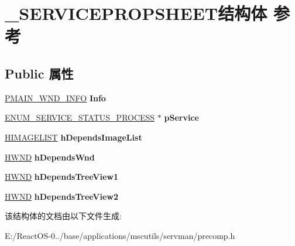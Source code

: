 \hypertarget{struct___s_e_r_v_i_c_e_p_r_o_p_s_h_e_e_t}{}\section{\+\_\+\+S\+E\+R\+V\+I\+C\+E\+P\+R\+O\+P\+S\+H\+E\+E\+T结构体 参考}
\label{struct___s_e_r_v_i_c_e_p_r_o_p_s_h_e_e_t}
\subsection*{Public 属性}
\begin{DoxyCompactItemize}
\item 
\mbox{\label{struct___s_e_r_v_i_c_e_p_r_o_p_s_h_e_e_t_ae9cf0384e6a06e002563e1fe7d062b21}} 
\hyperlink{struct___m_a_i_n___w_n_d___i_n_f_o}{P\+M\+A\+I\+N\+\_\+\+W\+N\+D\+\_\+\+I\+N\+FO} {\bfseries Info}
\item 
\mbox{\label{struct___s_e_r_v_i_c_e_p_r_o_p_s_h_e_e_t_a374a4d587ad2482d8907ab97d62e7708}} 
\hyperlink{struct___e_n_u_m___s_e_r_v_i_c_e___s_t_a_t_u_s___p_r_o_c_e_s_s_a}{E\+N\+U\+M\+\_\+\+S\+E\+R\+V\+I\+C\+E\+\_\+\+S\+T\+A\+T\+U\+S\+\_\+\+P\+R\+O\+C\+E\+SS} $\ast$ {\bfseries p\+Service}
\item 
\mbox{\label{struct___s_e_r_v_i_c_e_p_r_o_p_s_h_e_e_t_ad9228bb08cf7323bf046c5be743bb1dc}} 
\hyperlink{struct___i_m_a_g_e_l_i_s_t}{H\+I\+M\+A\+G\+E\+L\+I\+ST} {\bfseries h\+Depends\+Image\+List}
\item 
\mbox{\label{struct___s_e_r_v_i_c_e_p_r_o_p_s_h_e_e_t_a566594a49d36f2c8c0905963c4875f3c}} 
\hyperlink{interfacevoid}{H\+W\+ND} {\bfseries h\+Depends\+Wnd}
\item 
\mbox{\label{struct___s_e_r_v_i_c_e_p_r_o_p_s_h_e_e_t_a5c6ff083b664a00426d6673a2c3908bf}} 
\hyperlink{interfacevoid}{H\+W\+ND} {\bfseries h\+Depends\+Tree\+View1}
\item 
\mbox{\label{struct___s_e_r_v_i_c_e_p_r_o_p_s_h_e_e_t_a02528a12c1479bba2fe1a3f3bfd6aae0}} 
\hyperlink{interfacevoid}{H\+W\+ND} {\bfseries h\+Depends\+Tree\+View2}
\end{DoxyCompactItemize}


该结构体的文档由以下文件生成\+:\begin{DoxyCompactItemize}
\item 
E\+:/\+React\+O\+S-\/0../base/applications/mscutils/servman/precomp.\+h\end{DoxyCompactItemize}
